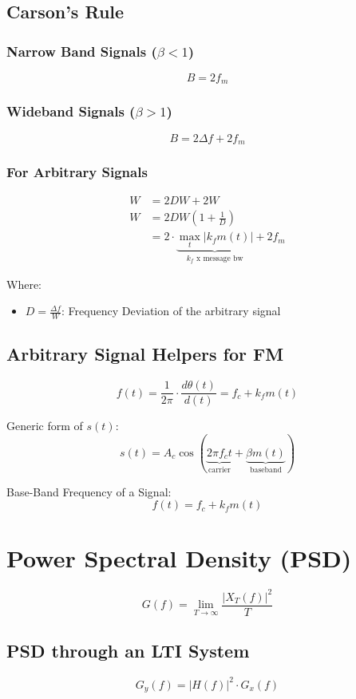 \documentclass[12pt]{article}
\begin{document}
\subsection{Carson's Rule}
\subsubsection{Narrow Band Signals ($\beta < 1$)}
\[
	B = 2 f_m
\]

\subsubsection{Wideband Signals ($\beta > 1$)}
\[
	B = 2 \Delta f + 2 f_m
\]
\subsubsection{For Arbitrary Signals}
\begin{align*}
	W & = 2 D W + 2 W                                                                            \\
	W & = 2DW(1 + \frac{1}{D})                                                                   \\
	  & = 2 \cdot \underbrace{\max_{t}\left|k_f m(t)\right|}_{\text{$k_f$ x message bw}} + 2 f_m
\end{align*}

\noindent Where:
\begin{itemize}
	\item $D = \frac{\Delta f}{W} $: Frequency Deviation of the arbitrary signal
\end{itemize}

\subsection{Arbitrary Signal Helpers for FM}
\[
	f(t) = \frac{1}{2\pi} \cdot \frac{d\theta(t)}{d(t)} = f_c + k_f m(t)
\]

Generic form of $s(t)$:
\[
	s(t) = A_c\cos(\underbrace{2 \pi f_c t}_{\text{carrier}} + \underbrace{\beta m(t)}_{\text{baseband}})
\]

Base-Band Frequency of a Signal:
\[
	f(t) = f_c + k_f m(t)
\]

\section*{Power Spectral Density (PSD)}
\[
	G(f) = \lim_{T \to \infty} \frac{|X_T(f)|^2}{T}
\]

\subsection{PSD through an LTI System}
\[
    G_y(f) = \left|H(f)\right|^2 \cdot G_x(f)
\]
\end{document}

